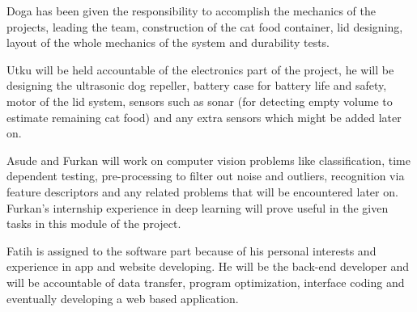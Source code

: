 Doga has been given the responsibility to accomplish the mechanics of the projects, leading the team, construction of the cat food container, lid designing, layout of the whole mechanics of the system and durability tests. 

Utku will be held accountable of the electronics part of the project, he will be designing the ultrasonic dog repeller, battery case for battery life and safety, motor of the lid system, sensors such as sonar (for detecting empty volume to estimate remaining cat food) and any extra sensors which might be added later on. 

Asude and Furkan will work on computer vision problems like classification, time dependent testing, pre-processing to filter out noise and outliers, recognition via feature descriptors and any related problems that will be encountered later on. Furkan's internship experience in deep learning will prove useful in the given tasks in this module of the project. 

Fatih is assigned to the software part because of his personal interests and experience in app and website developing. He will be the back-end developer and will be accountable of data transfer, program optimization, interface coding and eventually developing a web based application. 




